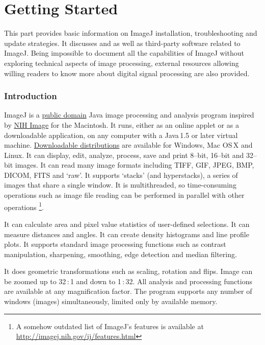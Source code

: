 
\part{Getting Started\label{part:Getting-Started}}

This part provides basic information on ImageJ installation, troubleshooting
and update strategies. It discusses 
and  as well as third-party software related
to ImageJ. Being impossible to document all the capabilities of ImageJ
without exploring technical aspects of image processing, external
resources allowing willing readers to know more about digital signal
processing are also provided.


\section{Introduction\label{sec:What-is-ImageJ?}}

ImageJ is a \href{http://rsb.info.nih.gov/ij/disclaimer.html}{public domain}
Java image processing and analysis program inspired by \href{http://rsb.info.nih.gov/nih-image/}{NIH Image}
for the Macintosh. It runs, either as an online applet or as a downloadable
application, on any computer with a Java\,1.5 or later virtual machine.
\href{http://imagej.nih.gov/ij/download.html}{Downloadable distributions}
are available for Windows, Mac OS\,X and Linux. It can display, edit,
analyze, process, save and print 8--bit, 16--bit and 32--bit images.
It can read many image formats including TIFF, GIF, JPEG, BMP, DICOM,
FITS and `raw'. It supports `stacks' (and hyperstacks), a series
of images that share a single window. It is multithreaded, so time-consuming
operations such as image file reading can be performed in parallel
with other operations%
\footnote{A somehow outdated list of ImageJ's features is available at \url{http://imagej.nih.gov/ij/features.html}%
}.

It can calculate area and pixel value statistics of user-defined selections.
It can measure distances and angles. It can create density histograms
and line profile plots. It supports standard image processing functions
such as contrast manipulation, sharpening, smoothing, edge detection
and median filtering.

It does geometric transformations such as scaling, rotation and flips.
Image can be zoomed up to 32\,:\,1 and down to 1\,:\,32. All analysis
and processing functions are available at any magnification factor.
The program supports any number of windows (images) simultaneously,
limited only by available memory.

